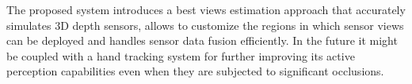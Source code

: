 The proposed system introduces a best views estimation approach that accurately simulates 3D depth sensors, allows to customize the regions in which sensor views can be deployed and handles sensor data fusion efficiently. In the future it might be coupled with a hand tracking system \cite{Kyriazis2013,Sridhar2016} for further improving its active perception capabilities even when they are subjected to significant occlusions.
